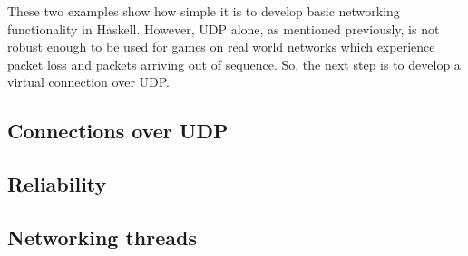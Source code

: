 These two examples show how simple it is to develop basic networking functionality in Haskell.
However, UDP alone, as mentioned previously, is not robust enough to be used for games on real
world networks which experience packet loss and packets arriving out of sequence. So, the next
step is to develop a virtual connection over UDP.

\subsection{Connections over UDP}


\subsection{Reliability}


\subsection{Networking threads}

